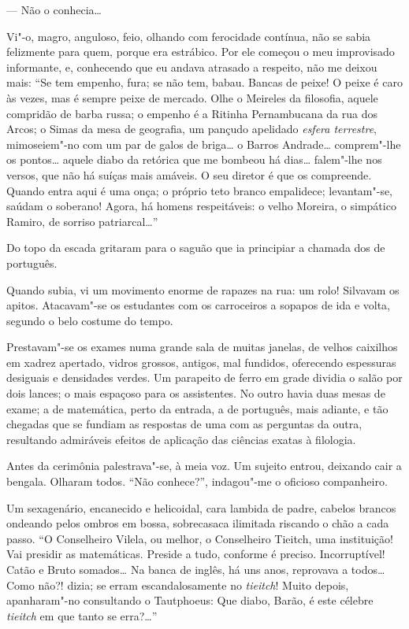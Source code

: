 --- Não o conhecia\ldots{}

Vi"-o, magro, anguloso, feio, olhando com ferocidade contínua, não se
sabia felizmente para quem, porque era estrábico. Por ele começou o meu
improvisado informante, e, conhecendo que eu andava atrasado a
respeito, não me deixou mais: ``Se tem empenho, fura; se não tem, babau.
Bancas de peixe! O peixe é caro às vezes, mas é sempre peixe de
mercado. Olhe o Meireles da filosofia, aquele compridão de barba russa;
o empenho é a Ritinha Pernambucana da rua dos Arcos; o Simas da mesa de
geografia, um pançudo apelidado \textit{esfera terrestre}, mimoseiem"-no com um
par de galos de briga\ldots{} o Barros Andrade\ldots{} comprem"-lhe os pontos\ldots{}
aquele diabo da retórica que me bombeou há dias\ldots{} falem"-lhe nos
versos, que não há suíças mais amáveis. O seu diretor é que os
compreende. Quando entra aqui é uma onça; o próprio teto branco
empalidece; levantam"-se, saúdam o soberano! Agora, há homens
respeitáveis: o velho Moreira, o simpático Ramiro, de sorriso
patriarcal\ldots{}'' 

Do topo da escada gritaram para o saguão que ia
principiar a chamada dos de português. 

Quando subia, vi um movimento
enorme de rapazes na rua: um rolo! Silvavam os apitos. Atacavam"-se os
estudantes com os carroceiros a sopapos de ida e volta, segundo o belo
costume do tempo. 

Prestavam"-se os exames numa grande sala de muitas
janelas, de velhos caixilhos em xadrez apertado, vidros grossos,
antigos, mal fundidos, oferecendo espessuras desiguais e densidades
verdes. Um parapeito de ferro em grade dividia o salão por dois lances;
o mais espaçoso para os assistentes. No outro havia duas mesas de
exame; a de matemática, perto da entrada, a de português, mais adiante,
e tão chegadas que se fundiam as respostas de uma com as perguntas da
outra, resultando admiráveis efeitos de aplicação das ciências exatas à
filologia. 

Antes da cerimônia palestrava"-se, à meia voz. Um sujeito
entrou, deixando cair a bengala. Olharam todos. ``Não conhece?'', 
indagou"-me o oficioso companheiro. 

Um sexagenário, encanecido e
helicoidal, cara lambida de padre, cabelos brancos ondeando pelos
ombros em bossa, sobrecasaca ilimitada riscando o chão a cada passo. ``O
Conselheiro Vilela, ou melhor, o Conselheiro Tieitch, uma instituição!
Vai presidir as matemáticas. Preside a tudo, conforme é preciso.
Incorruptível! Catão e Bruto somados\ldots{} Na banca de inglês, há uns
anos, reprovava a todos\ldots{} Como não?! dizia; se erram escandalosamente
no \textit{tieitch}! Muito depois, apanharam"-no consultando o Tautphoeus: Que
diabo, Barão, é este célebre \textit{tieitch} em que tanto se erra?\ldots{}'' 

